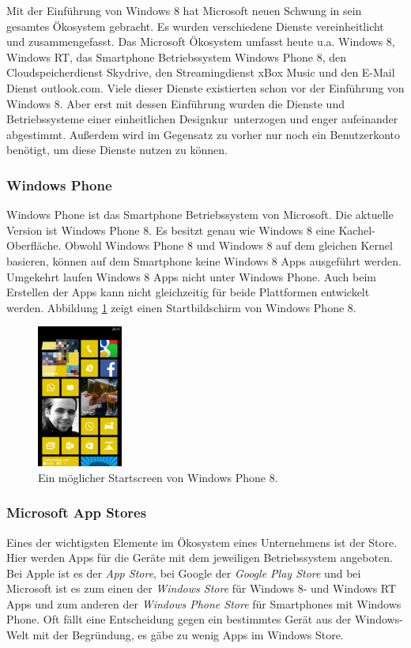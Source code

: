 \documentclass[12pt,a4paper,bibtotoc,abstracton]{scrartcl}
\begin{document}
Mit der Einführung von Windows 8 hat Microsoft neuen Schwung in sein gesamtes Ökosystem gebracht. Es wurden verschiedene Dienste vereinheitlicht und zusammengefasst. Das Microsoft Ökosystem umfasst heute u.a. Windows 8, Windows RT, das Smartphone Betriebssystem Windows Phone 8, den Cloudspeicherdienst Skydrive, den Streamingdienst xBox Music und den E-Mail Dienst outlook.com. Viele dieser Dienste existierten schon vor der Einführung von Windows 8. Aber erst mit dessen Einführung wurden die Dienste und Betriebssysteme einer einheitlichen \glqq Designkur\grqq\ unterzogen und enger aufeinander abgestimmt. Außerdem wird im Gegensatz zu vorher nur noch ein Benutzerkonto benötigt, um diese Dienste nutzen zu können.

\subsubsection{Windows Phone}
\label{subsubsec:windowsphone}
Windows Phone ist das Smartphone Betriebssystem von Microsoft. Die aktuelle Version ist Windows Phone 8. Es besitzt genau wie Windows 8 eine Kachel-Oberfläche. Obwohl Windows Phone 8 und Windows 8 auf dem gleichen Kernel basieren, können auf dem Smartphone keine Windows 8 Apps ausgeführt werden. Umgekehrt laufen Windows 8 Apps nicht unter Windows Phone. Auch beim Erstellen der Apps kann nicht gleichzeitig für beide Plattformen entwickelt werden. Abbildung \ref{fig:wp8} zeigt einen Startbildschirm von Windows Phone 8.

\begin{figure}[h]	
	\centering
	\includegraphics[width=0.25\textwidth]{Bilder/Screenshots/wp8/wp8_start.png} 
	\caption{Ein möglicher Startscreen von Windows Phone 8.}
	\label{fig:wp8}
\end{figure}  

\subsubsection{Microsoft App Stores}
\label{subsubsec:stores}
Eines der wichtigsten Elemente im Ökosystem eines Unternehmens ist der Store. Hier werden Apps für die Geräte mit dem jeweiligen Betriebssystem angeboten. Bei Apple ist es der \textit{App Store}, bei Google der \textit{Google Play Store} und bei Microsoft ist es  zum einen der \textit{Windows Store} für Windows 8- und Windows RT Apps und zum anderen der \textit{Windows Phone Store} für Smartphones mit Windows Phone. Oft fällt eine Entscheidung gegen ein bestimmtes Gerät aus der Windows-Welt mit der Begründung, es gäbe zu wenig Apps im Windows Store.
\end{document}
